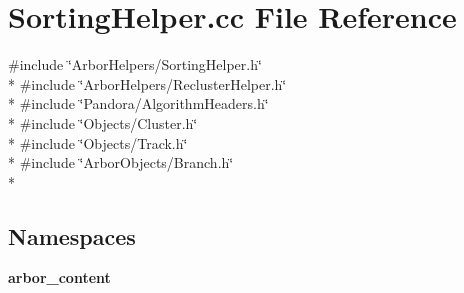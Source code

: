 \section{Sorting\+Helper.\+cc File Reference}
\label{SortingHelper_8cc}
{\ttfamily \#include \char`\"{}Arbor\+Helpers/\+Sorting\+Helper.\+h\char`\"{}}\\*
{\ttfamily \#include \char`\"{}Arbor\+Helpers/\+Recluster\+Helper.\+h\char`\"{}}\\*
{\ttfamily \#include \char`\"{}Pandora/\+Algorithm\+Headers.\+h\char`\"{}}\\*
{\ttfamily \#include \char`\"{}Objects/\+Cluster.\+h\char`\"{}}\\*
{\ttfamily \#include \char`\"{}Objects/\+Track.\+h\char`\"{}}\\*
{\ttfamily \#include \char`\"{}Arbor\+Objects/\+Branch.\+h\char`\"{}}\\*
\subsection*{Namespaces}
\begin{DoxyCompactItemize}
\item 
 {\bf arbor\+\_\+content}
\end{DoxyCompactItemize}
